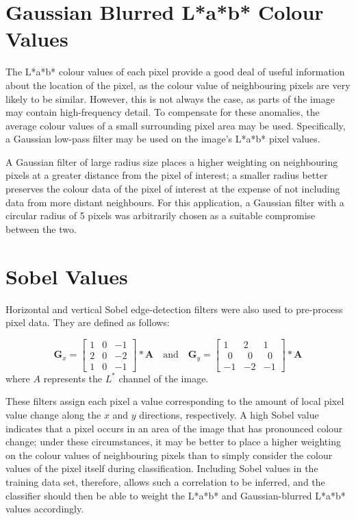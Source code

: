 \section{Gaussian Blurred L*a*b* Colour Values}
The L*a*b* colour values of each pixel provide a good deal of useful information about the location of the pixel, as the colour value of neighbouring pixels are very likely to be similar.  However, this is not always the case, as parts of the image may contain high-frequency detail.  To compensate for these anomalies, the average colour values of a small surrounding pixel area may be used. Specifically, a Gaussian low-pass filter may be used on the image's L*a*b* pixel values.  

A Gaussian filter of large radius size places a higher weighting on neighbouring pixels at a greater distance from the pixel of interest; a smaller radius better preserves the colour data of the pixel of interest at the expense of not including data from more distant neighbours.  For this application, a Gaussian filter with a circular radius of 5 pixels was arbitrarily chosen as a suitable compromise between the two. 

\section{Sobel Values}
Horizontal and vertical Sobel edge-detection filters were also used to pre-process pixel data. They are defined as follows:

$$ \mathbf{G}_x = 
\begin{bmatrix} 1 & 0 & -1 \\
2 & 0 & -2 \\
1 & 0 & -1 
\end{bmatrix} * \mathbf{A}
\quad
\mbox{and}
\quad   
\mathbf{G}_y = \begin{bmatrix} 
1 & 2 & 1  \\
\ \ 0 & \ \ 0 & \ \ 0 \\
-1 & -2 & -1 
\end{bmatrix} * \mathbf{A}
$$
where $A$ represents the $L^*$ channel of the image.

These filters assign each pixel a value corresponding to the amount of local pixel value change along the $x$ and $y$ directions, respectively.  A high Sobel value indicates that a pixel occurs in an area of the image that has pronounced colour change; under these circumstances, it may be better to place a higher weighting on the colour values of neighbouring pixels than to simply consider the colour values of the pixel itself during classification.  Including Sobel values in the training data set, therefore, allows such a correlation to be inferred, and the classifier should then be able to weight the L*a*b* and Gaussian-blurred L*a*b* values accordingly.